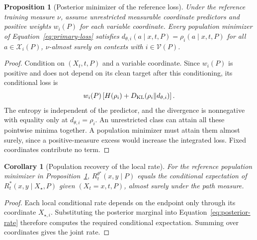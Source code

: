 \documentclass{article}
\newtheorem{proposition}[theorem]{Proposition}
\newtheorem{corollary}[theorem]{Corollary}
\theoremstyle{definition}
\begin{document}
\begin{proposition}[Posterior minimizer of the reference loss]
\label{prop:masked-bayes}
Under the reference training measure $\nu$, assume unrestricted measurable coordinate predictors
and positive weights $w_i(P)$ for each variable coordinate. Every population minimizer of
Equation~\ref{eq:primary-loss} satisfies
$d_{\theta,i}(a\mid x,t,P)=\rho_i(a\mid x,t,P)$ for all $a\in\mathcal X_i(P)$,
$\nu$-almost surely on contexts with $i\in\mathcal V(P)$.
\end{proposition}
\begin{proof}
Condition on $(X_t,t,P)$ and a variable coordinate. Since $w_i(P)$ is positive and does not depend
on its clean target after this conditioning, its conditional loss is
\begin{equation}
 w_i(P)\left[H(\rho_i)+D_{\rm KL}(\rho_i\Vert d_{\theta,i})\right].
\end{equation}
The entropy is independent of the predictor, and the divergence is nonnegative with equality only
at $d_{\theta,i}=\rho_i$. An unrestricted class can attain all these pointwise minima together.
A population minimizer must attain them almost surely, since a positive-measure excess would
increase the integrated loss. Fixed coordinates contribute no term.
\end{proof}

\begin{corollary}[Population recovery of the local rate]
\label{cor:local-rate-recovery}
For the reference population minimizer in Proposition~\ref{prop:masked-bayes},
$R_t^{\theta^\star}(x,y\mid P)$ equals the conditional expectation of
$R_t^*(x,y\mid X_\star,P)$ given $(X_t=x,t,P)$, almost surely under the path measure.
\end{corollary}
\begin{proof}
Each local conditional rate depends on the endpoint only through its coordinate $X_{\star,i}$.
Substituting the posterior marginal into Equation~\ref{eq:posterior-rate} therefore computes the
required conditional expectation. Summing over coordinates gives the joint rate.
\end{proof}
\end{document}
